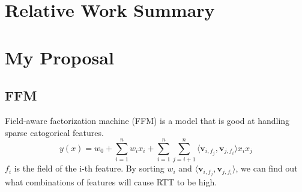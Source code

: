 \documentclass{manuscript}
\begin{document}
    \section{Relative Work Summary}

    \section{My Proposal}

    \subsection{FFM\cite{juan_field-aware_2016}}

    Field-aware factorization machine (FFM) is a model that is good at handling sparse catogorical features.
    $$ y(x) = w_0 + \sum^n_{i=1}w_ix_i + \sum^n_{i=1}\sum^n_{j=i+1}\langle \mathbf{v}_{i, f_j}, \mathbf{v}_{j, f_i}\rangle x_ix_j $$
    $f_i$ is the field of the i-th feature. By sorting $w_i$ and $\langle \mathbf{v}_{i, f_j}, \mathbf{v}_{j, f_i}\rangle$,
    we can find out what combinations of features will cause RTT to be high.

    
    
\end{document}
